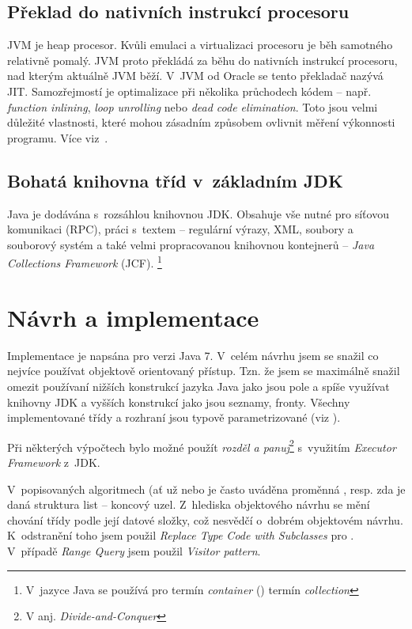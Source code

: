 \subsection{Překlad \bytecode{} do nativních instrukcí procesoru}

JVM je heap procesor.
Kvůli emulaci a virtualizaci procesoru je běh samotného \bytecode{} relativně pomalý.
JVM proto překládá za běhu \bytecode{} do nativních instrukcí procesoru, nad kterým aktuálně JVM běží.
V~JVM od Oracle se tento překladač nazývá JIT\cite{hunt2011java}.
Samozřejmostí je optimalizace při několika průchodech kódem -- např. \emph{function inlining}, \emph{loop unrolling} nebo \emph{dead code elimination}\cite{hunt2011java}.
Toto jsou velmi důležité vlastnosti, které mohou zásadním způsobem ovlivnit měření výkonnosti programu. Více viz~.

\subsection{Bohatá knihovna tříd v~základním JDK}

Java je dodávána s~rozsáhlou knihovnou JDK. Obsahuje vše nutné
pro síťovou komunikaci (RPC), práci s~textem -- regulární výrazy,
XML, soubory a souborový
systém a také velmi propracovanou knihovnou kontejnerů -- \emph{Java
Collections Framework }(JCF). \footnote{V~jazyce Java se používá pro termín \emph{container} (\CC) termín \emph{collection}}

\section{Návrh a implementace}
Implementace  je napsána pro verzi Java 7.
V~celém návrhu jsem se snažil co nejvíce používat objektově orientovaný přístup.
Tzn. že jsem se maximálně snažil omezit používaní nižších konstrukcí jazyka Java jako jsou pole a spíše využívat knihovny JDK a vyšších konstrukcí jako jsou seznamy, fronty.
Všechny implementované třídy a rozhraní jsou typově parametrizované (viz ).

Při některých výpočtech bylo možné použít \emph{rozděl a panuj}\cite{Cormen:2001:IA:580470}\footnote{V anj. \emph{Divide-and-Conquer}} s~využitím \emph{Executor Framework} z~JDK.

V~popisovaných algoritmech (ať už \BPTree{} nebo \MIndex{} je často uváděna proměnná , resp. zda je daná struktura list -- koncový uzel.
Z~hlediska objektového návrhu se mění chování třídy podle její datové složky, což nesvědčí o~dobrém objektovém návrhu.
K~odstranění toho jsem použil \emph{Replace Type Code with Subclasses}\cite{fowler1999refactoring} pro \BPTree{}.
V~případě \MIndex{} \emph{Range Query} jsem použil \emph{Visitor pattern}\cite{gamma1995design}.


